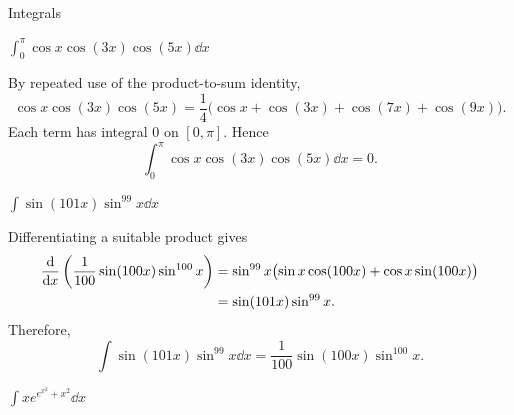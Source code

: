 \begin{expectedproblemgroup}{Integrals}
        \begin{expectedsubproblem}
            \(\displaystyle
                \int_0^\pi\cos x\cos(3x)\cos(5x)\dd x
            \)
        \end{expectedsubproblem}

        \begin{expectedsubsolution}
            By repeated use of the product-to-sum identity,
            \[
                \cos x\cos(3x)\cos(5x)
                =
                \frac{1}{4}
                \bigl(
                    \cos x+\cos(3x)+\cos(7x)+\cos(9x)
                \bigr).
            \]
            Each term has integral $0$ on $[0,\pi]$. Hence
            \[
                \boxed{
                    \int_0^\pi\cos x\cos(3x)\cos(5x)\dd x=0
                }.
            \]
        \end{expectedsubsolution}

        \begin{expectedsubproblem}
            \(\displaystyle
                \int\sin(101x)\sin^{99}x\dd x
            \)
        \end{expectedsubproblem}

        \begin{expectedsubsolution}
            Differentiating a suitable product gives
            \[
                \begin{aligned}
                    \frac{\mathop{}\!\mathrm{d} }{\mathop{}\!\mathrm{d} x}
                    \left(
                        \frac{1}{100}\sin(100x)\sin^{100}x
                    \right)
                    &=
                    \sin^{99}x
                    \bigl(
                        \sin x\cos(100x)
                        +
                        \cos x\sin(100x)
                    \bigr)\\
                    &=
                    \sin(101x)\sin^{99}x.
                \end{aligned}
            \]
            Therefore,
            \[
                \boxed{
                    \int\sin(101x)\sin^{99}x\dd x
                    =
                    \frac{1}{100}\sin(100x)\sin^{100}x
                }.
            \]
        \end{expectedsubsolution}

        \begin{expectedsubproblem}
            \(\displaystyle
                \int x e^{e^{x^2}+x^2}\dd x
            \)
        \end{expectedsubproblem}


\end{expectedproblemgroup}
